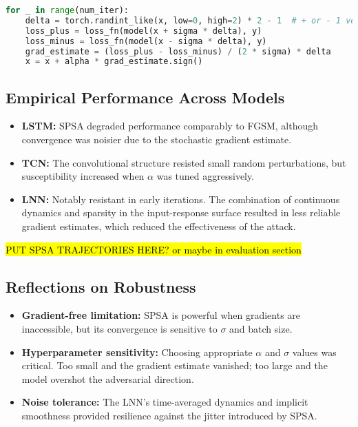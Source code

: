 \begin{lstlisting}[language=Python, caption={Simplified SPSA implementation}]
for _ in range(num_iter):
    delta = torch.randint_like(x, low=0, high=2) * 2 - 1  # + or - 1 vector
    loss_plus = loss_fn(model(x + sigma * delta), y)
    loss_minus = loss_fn(model(x - sigma * delta), y)
    grad_estimate = (loss_plus - loss_minus) / (2 * sigma) * delta
    x = x + alpha * grad_estimate.sign()
\end{lstlisting}

\subsection{Empirical Performance Across Models}
\begin{itemize}
    \item \textbf{LSTM:} SPSA degraded performance comparably to FGSM, although convergence was noisier due to the stochastic gradient estimate.
    \item \textbf{TCN:} The convolutional structure resisted small random perturbations, but susceptibility increased when $\alpha$ was tuned aggressively.
    \item \textbf{LNN:} Notably resistant in early iterations. The combination of continuous dynamics and sparsity in the input-response surface resulted in less reliable gradient estimates, which reduced the effectiveness of the attack.
\end{itemize}

\hl{PUT SPSA TRAJECTORIES HERE? or maybe in evaluation section}


\subsection{Reflections on Robustness}
\begin{itemize}
    \item \textbf{Gradient-free limitation:} SPSA is powerful when gradients are inaccessible, but its convergence is sensitive to $\sigma$ and batch size.
    \item \textbf{Hyperparameter sensitivity:} Choosing appropriate $\alpha$ and $\sigma$ values was critical. Too small and the gradient estimate vanished; too large and the model overshot the adversarial direction.
    \item \textbf{Noise tolerance:} The LNN’s time-averaged dynamics and implicit smoothness provided resilience against the jitter introduced by SPSA.
\end{itemize}


